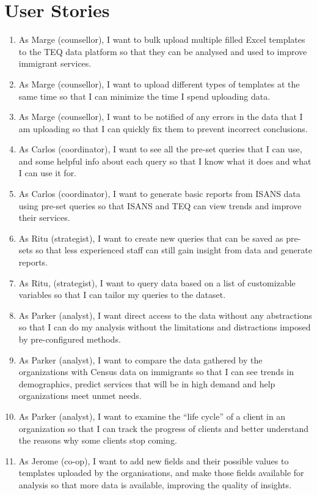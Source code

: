 \documentclass[]{scrreprt}
\begin{document}
\section{User Stories}
\begin{enumerate}[label=\textbf{U\arabic*.}]
	\item As Marge (counsellor), I want to bulk upload multiple filled Excel templates to the TEQ data platform so that they can be analysed and used to improve immigrant services.
	
	\item As Marge (counsellor), I want to upload different types of templates at the same time so that I can minimize the time I spend uploading data.
	
	\item As Marge (counsellor), I want to be notified of any errors in the data that I am uploading so that I can quickly fix them to prevent incorrect conclusions.
	
	\item As Carlos (coordinator), I want to see all the pre-set queries that I can use, and some helpful info about each query so that I know what it does and what I can use it for.
	
	\item As Carlos (coordinator), I want to generate basic reports from ISANS data using pre-set queries so that ISANS and TEQ can view trends and improve their services.
	
	\item As Ritu (strategist), I want to create new queries that can be saved as pre-sets so that less experienced staff can still gain insight from data and generate reports. 
	
	\item As Ritu, (strategist), I want to query data based on a list of customizable variables so that I can tailor my queries to the dataset.
	
	\item As Parker (analyst), I want direct access to the data without any abstractions so that I can do my analysis without the limitations and distractions imposed by pre-configured methods.
	
	\item As Parker (analyst), I want to compare the data gathered by the organizations with Census data on immigrants so that I can see trends in demographics, predict services that will be in high demand and help organizations meet unmet needs.
	
	\item As Parker (analyst), I want to examine the ``life cycle'' of a client in an organization so that I can track the progress of clients and better understand the reasons why some clients stop coming.
	
	\item As Jerome (co-op), I want to add new fields and their possible values to templates uploaded by the organisations, and make those fields available for analysis so that more data is available, improving the quality of insights.
\end{enumerate}
\end{document}
